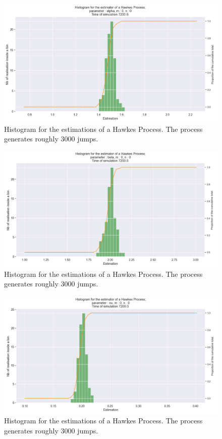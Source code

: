 \begin{figure}
\centering
\includegraphics[width = 0.75 \textwidth]{../imag/chap2/hist_1.png}
\caption{Histogram for the estimations of a Hawkes Process. The process generates roughly 3000 jumps.}
\label{fig:hist_1_alpha}
\end{figure}


\begin{figure}
\centering
\includegraphics[width = 0.75 \textwidth]{../imag/chap2/hist_2.png}
\caption{Histogram for the estimations of a Hawkes Process. The process generates roughly 3000 jumps.}
\label{fig:hist_1_beta}
\end{figure}


\begin{figure}
\centering
\includegraphics[width = 0.75 \textwidth]{../imag/chap2/hist_3.png}
\caption{Histogram for the estimations of a Hawkes Process. The process generates roughly 3000 jumps.}
\label{fig:hist_1_nu}
\end{figure}


